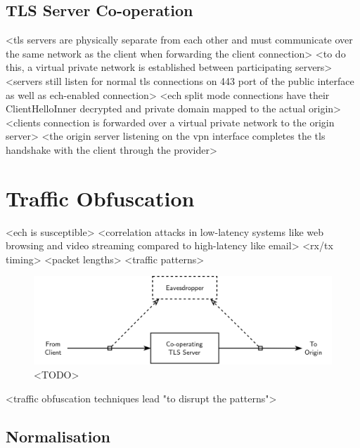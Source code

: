 \subsection{TLS Server Co-operation}

<tls servers are physically separate from each other and must communicate over the same network as the client when forwarding the client connection>
<to do this, a virtual private network is established between participating servers>
<servers still listen for normal tls connections on 443 port of the public interface as well as ech-enabled connection>
<ech split mode connections have their ClientHelloInner decrypted and private domain mapped to the actual origin>
<clients connection is forwarded over a virtual private network to the origin server>
<the origin server listening on the vpn interface completes the tls handshake with the client through the provider>







\section{Traffic Obfuscation}

<ech is susceptible>\cite{trevisan2023attacking}
<correlation attacks in low-latency systems like web browsing and video streaming compared to high-latency like email>\cite{levine2004timing}
<rx/tx timing> <packet lengths> <traffic patterns> \cite{defabbia2011analyzing}

\begin{figure}[ht]
\centerline{\includegraphics[width=150mm]{images/correlation-attack.png}}
\caption[Diagram of various traffic metrics useful in correlation attacks]{<TODO>}
\label{correlation_figure}
\end{figure}

<traffic obfuscation techniques lead "to disrupt the patterns">

\subsection{Normalisation}


